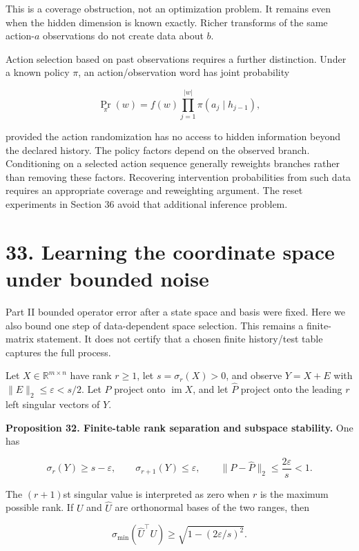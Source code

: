 \documentclass[11pt,letterpaper]{article}
\begin{document}
This is a coverage obstruction, not an optimization problem. It remains
even when the hidden dimension is known exactly. Richer transforms of
the same action-\(a\) observations do not create data about \(b\).

Action selection based on past observations requires a further
distinction. Under a known policy \(\pi\), an action/observation word
has joint probability

\[
\Pr_\pi(w)=f(w)\prod_{j=1}^{|w|}\pi(a_j\mid h_{j-1}),
\]

provided the action randomization has no access to hidden information
beyond the declared history. The policy factors depend on the observed
branch. Conditioning on a selected action sequence generally reweights
branches rather than removing these factors. Recovering intervention
probabilities from such data requires an appropriate coverage and
reweighting argument. The reset experiments in Section 36 avoid that
additional inference problem.

\section{33. Learning the coordinate space under bounded
noise}\label{learning-the-coordinate-space-under-bounded-noise}

Part II bounded operator error after a state space and basis were fixed.
Here we also bound one step of data-dependent space selection. This
remains a finite-matrix statement. It does not certify that a chosen
finite history/test table captures the full process.

Let \(X\in\mathbb R^{m\times n}\) have rank \(r\geq1\), let
\(s=\sigma_r(X)>0\), and observe \(Y=X+E\) with
\(\|E\|_2\leq\varepsilon<s/2\). Let \(P\) project onto
\(\operatorname{im}X\), and let \(\widehat P\) project onto the leading
\(r\) left singular vectors of \(Y\).

\textbf{Proposition 32. Finite-table rank separation and subspace
stability.} One has

\[
\sigma_r(Y)\geq s-\varepsilon,\qquad
\sigma_{r+1}(Y)\leq\varepsilon,\qquad
\|P-\widehat P\|_2\leq\frac{2\varepsilon}{s}<1.
\]

The \((r+1)\)st singular value is interpreted as zero when \(r\) is the
maximum possible rank. If \(U\) and \(\widehat U\) are orthonormal bases
of the two ranges, then

\[
\sigma_{\min}(\widehat U^\top U)
\geq\sqrt{1-(2\varepsilon/s)^2}.
\]
\end{document}

